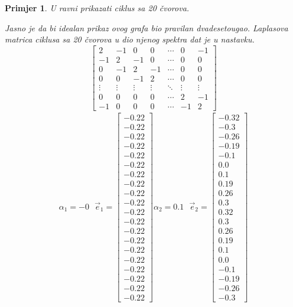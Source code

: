 \documentclass[11pt]{article}
\newtheorem{example}{Primjer}
\begin{document}
	\begin{example}
		U ravni prikazati ciklus sa 20 čvorova. 
		
		Jasno je da bi idealan prikaz ovog grafa bio pravilan dvadesetougao. Laplasova matrica ciklusa sa 20 čvorova u dio njenog spektra dat je u nastavku.
		\[
			\begin{bmatrix}
				2 & -1 & 0 & 0 & \cdots & 0 & -1 \\
				-1 & 2 & -1 & 0 & \cdots & 0 & 0 \\
				0 & -1 & 2 & -1 & \cdots & 0 & 0 \\
				0 & 0 & -1 & 2 & \cdots & 0 & 0 \\
				\vdots & \vdots & \vdots & \vdots & \ddots & \vdots & \vdots \\
				0 & 0 & 0 & 0 & \cdots & 2 & -1 \\
				-1 & 0 & 0 & 0 & \cdots & -1 & 2
            \end{bmatrix}	
        \]
		\[
			\begin{split}
				\alpha_1=-0   \text{  } \vec{e}_1 = \begin{bmatrix} -0.22 \\ -0.22 \\ -0.22 \\ -0.22 \\ -0.22 \\ -0.22 \\ -0.22 \\ -0.22 \\ -0.22 \\ -0.22 \\ -0.22 \\ -0.22 \\ -0.22 \\ -0.22 \\ -0.22 \\ -0.22 \\ -0.22 \\ -0.22 \\ -0.22 \\ -0.22 \end{bmatrix}  
				\alpha_2=0.1  \text{  } \vec{e}_2 = \begin{bmatrix} -0.32 \\ -0.3 \\ -0.26 \\ -0.19 \\ -0.1 \\ 0.0 \\ 0.1 \\ 0.19 \\ 0.26 \\ 0.3 \\ 0.32 \\ 0.3 \\ 0.26 \\ 0.19 \\ 0.1 \\ 0.0 \\ -0.1 \\ -0.19 \\ -0.26 \\ -0.3 \end{bmatrix} 

\end{split}\]
\end{example}
\end{document}
